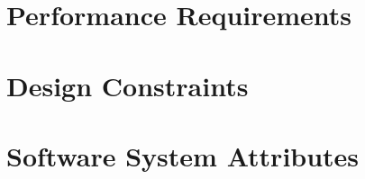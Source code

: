 \section{Performance Requirements}

\section{Design Constraints}

\section{Software System Attributes}